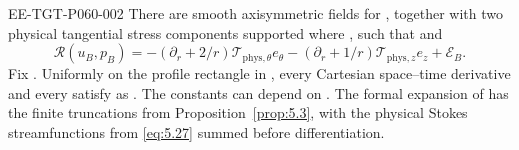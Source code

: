 \begin{proposition}\label{prop:5.5}
\begin{EESegment}{EE-TGT-P060-002}
There are smooth axisymmetric fields  for , together with two
physical tangential stress components  supported where
, such that
 and
\begin{equation}
 \mathscr R(u_B,p_B)
 =-(\partial_r+2/r)\mathcal T_{\mathrm{phys},\theta}e_\theta
  -(\partial_r+1/r)\mathcal T_{\mathrm{phys},z}e_z+\mathcal E_B.
 \tag{5.41}\label{eq:5.41}
\end{equation}
Fix . Uniformly on the profile rectangle
 in , every Cartesian space--time
derivative  and every  satisfy
 as
. The constants can depend on . The formal expansion of
 has the finite truncations
 from Proposition~\ref{prop:5.3}, with the physical Stokes streamfunctions
 from \eqref{eq:5.27} summed before differentiation.
\end{EESegment}


\end{proposition}
